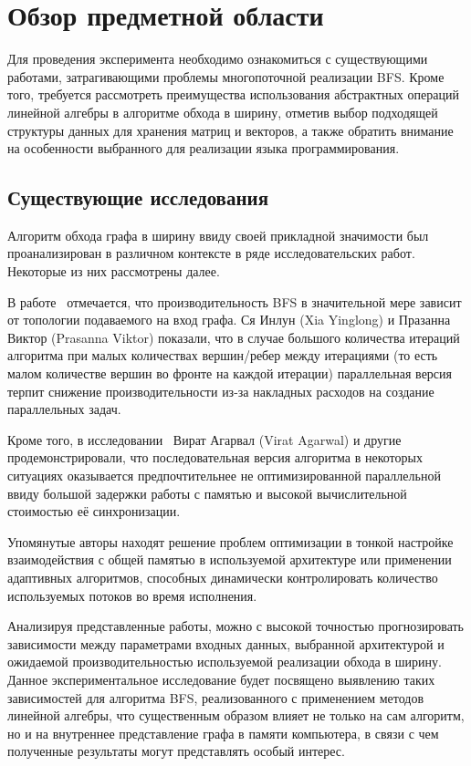 
\section{Обзор предметной области}
\label{sec:relatedworks}
Для проведения эксперимента необходимо ознакомиться с существующими работами, затрагивающими проблемы многопоточной реализации BFS. Кроме того, требуется рассмотреть преимущества использования абстрактных операций линейной алгебры в алгоритме обхода в ширину, отметив выбор подходящей структуры данных для хранения матриц и векторов, а также обратить внимание на особенности выбранного для реализации языка программирования.

\subsection{Существующие исследования}
Алгоритм обхода графа в ширину ввиду своей прикладной значимости был проанализирован в различном контексте в ряде исследовательских работ. Некоторые из них рассмотрены далее.

В работе~\cite{adaptiveBFS} отмечается, что производительность BFS в значительной мере зависит от топологии подаваемого на вход графа. Ся Инлун (Xia Yinglong) и Празанна Виктор (Prasanna Viktor) показали, что в случае большого количества итераций алгоритма при малых количествах вершин/ребер между итерациями (то есть малом количестве вершин во фронте на каждой итерации) параллельная версия терпит снижение производительности из-за накладных расходов на создание параллельных задач.

Кроме того, в исследовании~\cite{scalableBFS} Вират Агарвал (Virat Agarwal) и другие продемонстрировали, что последовательная версия алгоритма в некоторых ситуациях оказывается предпочтительнее не оптимизированной параллельной ввиду большой задержки работы с памятью и высокой вычислительной стоимостью её синхронизации. 

Упомянутые авторы находят решение проблем оптимизации в тонкой настройке взаимодействия с общей памятью в используемой архитектуре или применении адаптивных алгоритмов, способных динамически контролировать количество используемых потоков во время исполнения.

Анализируя представленные работы, можно с высокой точностью прогнозировать зависимости между параметрами входных данных, выбранной архитектурой и ожидаемой производительностью используемой реализации обхода в ширину. Данное экспериментальное исследование будет посвящено выявлению таких зависимостей для алгоритма BFS, реализованного с применением методов линейной алгебры, что существенным образом влияет не только на сам алгоритм, но и на внутреннее представление графа в памяти компьютера, в связи с чем полученные результаты могут представлять особый интерес.

